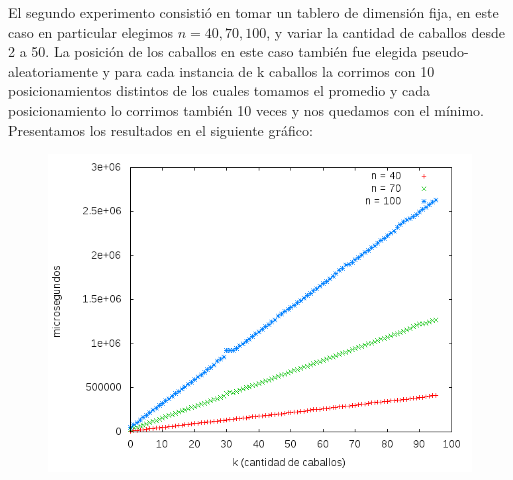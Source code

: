 El segundo experimento consistió en tomar un tablero de dimensión fija, en este caso en particular elegimos $n = 40, 70, 100$, y 
variar la cantidad de caballos desde 2 a 50. La posición de los caballos en este caso también fue elegida pseudo-aleatoriamente
y para cada instancia de k caballos la corrimos con 10 posicionamientos distintos de los cuales tomamos el promedio y cada posicionamiento
lo corrimos también 10 veces y nos quedamos con el mínimo. Presentamos los resultados en el siguiente gráfico:
\begin{figure}[H]
	\begin{minipage}[t]{\linewidth}
		\centering
		\includegraphics[width=\textwidth]{p2_varia_k.png}
		\label{fig:p2_complejidad_varia_k}
	\end{minipage}
\end{figure}

